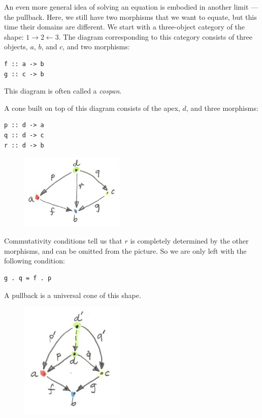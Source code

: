 An even more general idea of solving an equation is embodied in another
limit --- the pullback. Here, we still have two morphisms that we want
to equate, but this time their domains are different. We start with a
three-object category of the shape:
$1\rightarrow2\leftarrow3$. The diagram corresponding to
this category consists of three objects, $a$, $b$, and
$c$, and two morphisms:

\begin{Verbatim}
f :: a -> b
g :: c -> b
\end{Verbatim}

This diagram is often called a \emph{cospan}.

A cone built on top of this diagram consists of the apex, $d$,
and three morphisms:

\begin{Verbatim}
p :: d -> a
q :: d -> c
r :: d -> b
\end{Verbatim}

\begin{figure}[H]
\centering
\includegraphics[width=50mm]{images/pullbackcone.jpg}
\end{figure}

\noindent
Commutativity conditions tell us that $r$ is completely
determined by the other morphisms, and can be omitted from the picture.
So we are only left with the following condition:

\begin{Verbatim}
g . q = f . p
\end{Verbatim}
A pullback is a universal cone of this shape.

\begin{figure}[H]
\centering
\includegraphics[width=50mm]{images/pullbacklimit.jpg}
\end{figure}


